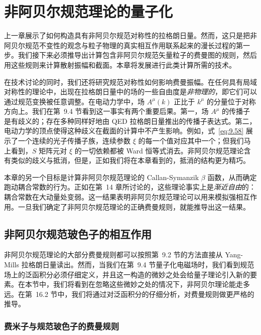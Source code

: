 \chapter{非阿贝尔规范理论的量子化}

上一章展示了如何构造具有非阿贝尔规范对称性的拉格朗日量。然而，这只是把非阿贝尔规范不变性的观念与粒子物理的真实相互作用联系起来的漫长过程的第一步。我们接下来必须推导出计算包含非阿贝尔规范矢量粒子的费曼图的规则，然后用这些规则来计算散射振幅和截面。本章将发展进行此类计算所需的技术。

在技术讨论的同时，我们还将研究规范对称性如何影响费曼振幅。在任何具有局域对称性的理论中，出现在拉格朗日量中的场的一些自由度是\emph{非物理的}，即它们可以通过规范变换被任意调整。在电动力学中，场 $A^\mu(k)$ 正比于 $k^\mu$ 的分量位于对称方向上。我们在第~9.4 节看到这一事实有两个重要后果。第一，场 $A^\mu$ 的传播子是有歧义的；存在多种同样好地由 QED 拉格朗日量推出的传播子表达式。第二，电动力学的顶点使得这种歧义在截面的计算中不产生影响。例如，式~\eqref{eq:9.58} 展示了一个连续的光子传播子族，连续参数 $\xi$ 的每一个值对应其中一个；但我们马上看到，$S$ 矩阵元对 $\xi$ 的一切依赖都被 Ward 恒等式消去。非阿贝尔规范理论含有类似的歧义与抵消，但是，正如我们将在本章看到的，抵消的结构更为精巧。

本章的另一个目标是计算非阿贝尔规范理论的 Callan-Symanzik $\beta$ 函数，从而确定跑动耦合常数的行为。正如在第~14 章所讨论的，这些理论事实上是\emph{渐近自由}的：耦合常数在大动量处变弱。这一结果表明非阿贝尔规范理论可以用来模拟强相互作用。一旦我们确定了非阿贝尔规范理论的正确费曼规则，就能推导出这一结果。

\section{非阿贝尔规范玻色子的相互作用}

非阿贝尔规范理论的大部分费曼规则都可以按照第~9.2 节的方法直接从 Yang-Mills 拉格朗日量读出。然而，当我们在第~9.4 节量子化电磁场时，我们看到规范场上的泛函积分必须仔细定义，并且这一构造的微妙之处会给量子理论引入新的要素。在本节中，我们将看到在忽略这些微妙之处的情况下，非阿贝尔理论能走多远。在第~16.2 节中，我们将通过对泛函积分的仔细分析，对费曼规则做更严格的推导。

\subsection{费米子与规范玻色子的费曼规则}

